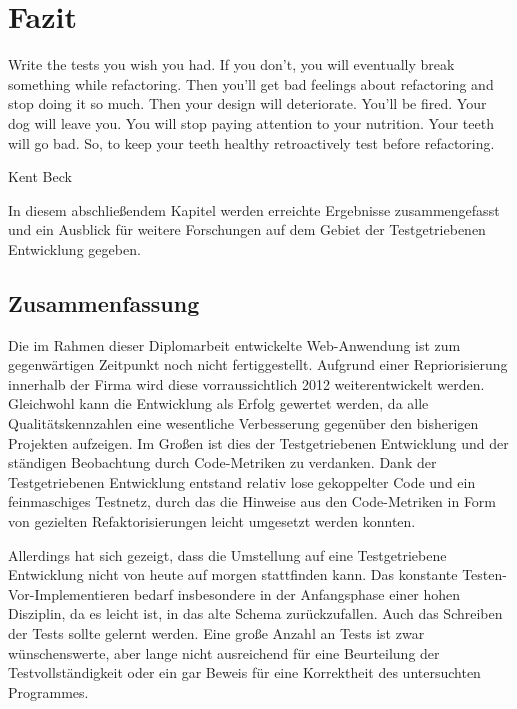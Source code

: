\chapter{Fazit}
\label{sec:fazit}
\epigraph{Write the tests you wish you had. If you don't, you will eventually break something while refactoring. Then you'll get bad feelings about refactoring and stop doing it so much. Then your design will deteriorate. You'll be fired. Your dog will leave you. You will stop paying attention to your nutrition. Your teeth will go bad. So, to keep your teeth healthy retroactively test before refactoring.}{Kent Beck \citep{beck_test_2002}}

In diesem abschließendem Kapitel werden erreichte Ergebnisse zusammengefasst und ein Ausblick für weitere Forschungen auf dem Gebiet der Testgetriebenen Entwicklung gegeben.

\section{Zusammenfassung}



Die im Rahmen dieser Diplomarbeit entwickelte Web-Anwendung ist zum gegenwärtigen Zeitpunkt noch nicht fertiggestellt. Aufgrund einer Repriorisierung innerhalb der Firma wird diese vorraussichtlich 2012 weiterentwickelt werden. Gleichwohl kann die Entwicklung als Erfolg gewertet werden, da alle Qualitätskennzahlen eine wesentliche Verbesserung gegenüber den bisherigen Projekten aufzeigen. Im Großen ist dies der Testgetriebenen Entwicklung und der ständigen Beobachtung durch Code-Metriken zu verdanken. Dank der Testgetriebenen Entwicklung entstand relativ lose gekoppelter Code und ein feinmaschiges Testnetz, durch das die Hinweise aus den Code-Metriken in Form von gezielten Refaktorisierungen leicht umgesetzt werden konnten.

Allerdings hat sich gezeigt, dass die Umstellung auf eine Testgetriebene Entwicklung nicht von heute auf morgen stattfinden kann. Das konstante Testen-Vor\hyp{}Implementieren bedarf insbesondere in der Anfangsphase einer hohen Disziplin, da es leicht ist, in das alte Schema zurückzufallen. Auch das Schreiben der Tests sollte gelernt werden. Eine große Anzahl an Tests ist zwar wünschenswerte, aber lange nicht ausreichend für eine Beurteilung der Testvollständigkeit oder ein gar Beweis für eine Korrektheit des untersuchten Programmes.

